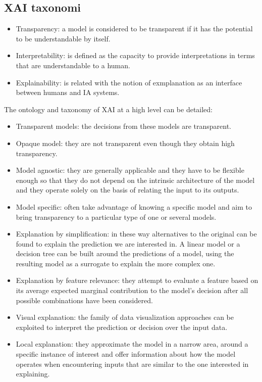 	\subsection{XAI taxonomi}

	\begin{itemize}
		\item Transparency: a model is considered to be transparent if it has the potential to be understandable by itself.
		\item Interpretability: is defined as the capacity to provide interpretations in terms that are understandable to a human.
		\item Explainability: is related with the notion of exmplanation as an interface between humans and IA systems.
	\end{itemize}

	The ontology and taxonomy of XAI at a high level can be detailed:

	\begin{itemize}
		\item Transparent models: the decisions from these models are transparent.
		\item Opaque model: they are not transparent even though they obtain high transparency.
		\item Model agnostic: they are generally applicable and they have to be flexible enough so that they do not depend on the intrinsic architecture of the model and  they operate solely on the basis of relating the input to its outputs.
		\item Model specific: often take advantage of knowing a specific model and aim to bring transparency to a particular type of one or several models.
		\item Explanation by simplification: in these way alternatives to the original can be found to explain the prediction we are interested in.
			A linear model or a decision tree can be built around the predictions of a model, using the resulting model as a surrogate to explain the more complex one.
		\item Explanation by feature relevance: they attempt to evaluate a feature based on its average expected marginal contribution to the model's decision after all possible combinations have been considered.
		\item Visual explanation: the family of data visualization approaches can be exploited to interpret the prediction or decision over the input data.
		\item Local explanation: they approximate the model in a narrow area, around a specific instance of interest and offer information about how the model operates when encountering inputs that are similar to the one interested in explaining.
	\end{itemize}

